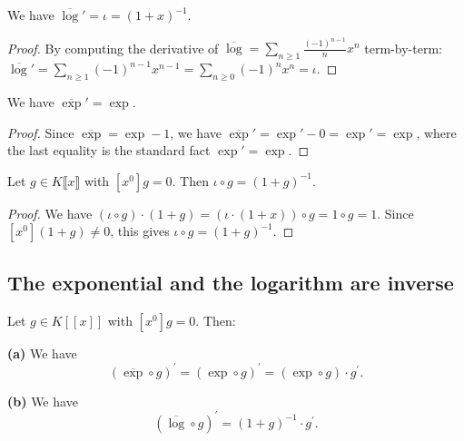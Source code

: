\begin{lemma}
\label{lem.fps.derivative-logbar}
\leanhelper
\leanok
We have $\overline{\log}' = \iota = (1+x)^{-1}$.
\end{lemma}

\begin{proof}
\leanok
By computing the derivative of $\overline{\log} = \sum_{n \ge 1} \frac{(-1)^{n-1}}{n} x^n$
term-by-term:
$\overline{\log}' = \sum_{n \ge 1} (-1)^{n-1} x^{n-1} = \sum_{n \ge 0} (-1)^n x^n = \iota$.
\end{proof}

\begin{lemma}
\label{lem.fps.derivative-expbar}
\leanhelper
\leanok
We have $\overline{\exp}' = \exp$.
\end{lemma}

\begin{proof}
\leanok
Since $\overline{\exp} = \exp - 1$, we have $\overline{\exp}' = \exp' - 0 = \exp' = \exp$,
where the last equality is the standard fact $\exp' = \exp$.
\end{proof}

\begin{lemma}[Substitution of $(1+x)^{-1}$]
\label{lem.fps.invOnePlusX-subst}
\leanhelper
\leanok
Let $g \in K\llbracket x \rrbracket$ with $[x^0]g = 0$.
Then $\iota \circ g = (1+g)^{-1}$.
\end{lemma}

\begin{proof}
\leanok
We have $(\iota \circ g) \cdot (1 + g)
= (\iota \cdot (1+x)) \circ g = 1 \circ g = 1$.
Since $[x^0](1+g) \ne 0$, this gives $\iota \circ g = (1+g)^{-1}$.
\end{proof}

\subsection{The exponential and the logarithm are inverse}

\begin{proposition}
\label{prop.fps.exp-log-der}
\leantarget
\leanok
Let $g\in K\left[\left[x\right]\right]$
with $\left[x^{0}\right]g=0$. Then: \medskip

\textbf{(a)} We have
\[
\left(\overline{\exp}\circ g\right)^{\prime}=\left(\exp\circ g\right)
^{\prime}=\left(\exp\circ g\right)\cdot g^{\prime}.
\]

\textbf{(b)} We have
\[
\left(\overline{\log}\circ g\right)^{\prime}=\left(1+g\right)
^{-1}\cdot g^{\prime}.
\]
\end{proposition}

